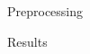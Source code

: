 \documentclass[12pt]{beamer}
\begin{document}
\begin{frame}{Preprocessing}

\end{frame}

\begin{frame}{Results}
\resizebox{\linewidth}{!}{}

\end{frame}
\end{document}

